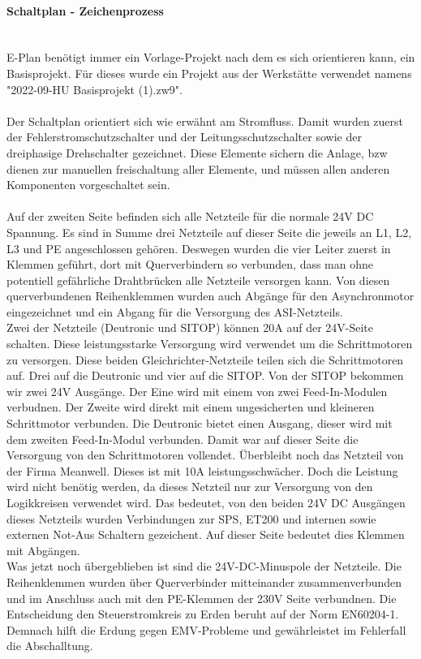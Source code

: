     \paragraph{Schaltplan - Zeichenprozess}\mbox{}\\
    E-Plan benötigt immer ein Vorlage-Projekt nach dem es sich orientieren kann, ein Basisprojekt. Für dieses wurde ein Projekt aus der Werkstätte verwendet namens "2022-09-HU Basisprojekt (1).zw9".\\\\ 
    Der Schaltplan orientiert sich wie erwähnt am Stromfluss. Damit wurden zuerst der Fehlerstromschutzschalter und der Leitungsschutzschalter sowie der dreiphasige Drehschalter gezeichnet. Diese Elemente sichern die Anlage, bzw dienen zur manuellen freischaltung aller Elemente, und müssen allen anderen Komponenten vorgeschaltet sein.\\\\
    Auf der zweiten Seite befinden sich alle Netzteile für die normale 24V DC Spannung. Es sind in Summe drei Netzteile auf dieser Seite die jeweils an L1, L2, L3 und PE angeschlossen gehören. Deswegen wurden die vier Leiter zuerst in Klemmen geführt, dort mit Querverbindern so verbunden, dass man ohne potentiell gefährliche Drahtbrücken alle Netzteile versorgen kann. Von diesen querverbundenen Reihenklemmen wurden auch Abgänge für den Asynchronmotor eingezeichnet und ein Abgang für die Versorgung des ASI-Netzteils.\\ Zwei der Netzteile (Deutronic und SITOP) können 20A auf der 24V-Seite schalten. Diese leistungsstarke Versorgung wird verwendet um die Schrittmotoren zu versorgen. Diese beiden Gleichrichter-Netzteile teilen sich die Schrittmotoren auf. Drei auf die Deutronic und vier auf die SITOP. Von der SITOP bekommen wir zwei 24V Ausgänge. Der Eine wird mit einem von zwei Feed-In-Modulen verbudnen. Der Zweite wird direkt mit einem ungesicherten und kleineren Schrittmotor verbunden. Die Deutronic bietet einen Ausgang, dieser wird mit dem zweiten Feed-In-Modul verbunden. Damit war auf dieser Seite die Versorgung von den Schrittmotoren vollendet. Überbleibt noch das Netzteil von der Firma Meanwell. Dieses ist mit 10A leistungsschwächer. Doch die Leistung wird nicht benötig werden, da dieses Netzteil nur zur Versorgung von den Logikkreisen verwendet wird. Das bedeutet, von den beiden 24V DC Ausgängen dieses Netzteils wurden Verbindungen zur SPS, ET200 und internen sowie externen Not-Aus Schaltern gezeichent. Auf dieser Seite bedeutet dies Klemmen mit Abgängen.\\Was jetzt noch übergeblieben ist sind die 24V-DC-Minuspole der Netzteile. Die Reihenklemmen wurden über Querverbinder mitteinander zusammenverbunden und im Anschluss auch mit den PE-Klemmen der 230V Seite verbundnen. Die Entscheidung den Steuerstromkreis zu Erden beruht auf der Norm EN60204-1. Demnach hilft die Erdung gegen EMV-Probleme und gewährleistet im Fehlerfall die Abschalltung. \cite{elektronet_steuerstromkreis_geerdet}\cite{beckhoff_steuerstromkreis_geerdet}\\\\
